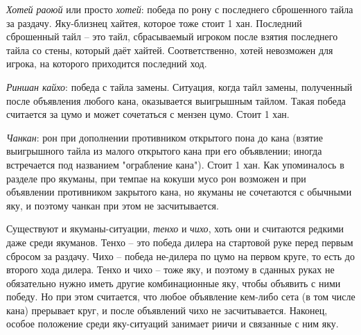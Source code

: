 \textit{Хотей раоюй} или просто \textit{хотей}: победа по рону с последнего сброшенного тайла за раздачу. Яку-близнец хайтея, которое тоже стоит 1 хан. Последний сброшенный тайл – это тайл, сбрасываемый игроком после взятия последнего тайла со стены, который даёт хайтей. Соответственно, хотей невозможен для игрока, на которого приходится последний ход.

\textit{Риншан кайхо}: победа с тайла замены. Ситуация, когда тайл замены, полученный после объявления любого кана, оказывается выигрышным тайлом. Такая победа считается за цумо и может сочетаться с мензен цумо. Стоит 1 хан. 

\textit{Чанкан}: рон при дополнении противником открытого пона до кана (взятие выигрышного тайла из малого открытого кана при его объявлении; иногда встречается под названием "ограбление кана"). Стоит 1 хан. Как упоминалось в разделе про якуманы, при темпае на кокуши мусо рон возможен и при объявлении противником закрытого кана, но якуманы не сочетаются с обычными яку, и поэтому чанкан при этом не засчитывается.

Существуют и якуманы-ситуации, \textit{тенхо} и \textit{чихо}, хоть они и считаются редкими даже среди якуманов. Тенхо – это победа дилера на стартовой руке перед первым сбросом за раздачу. Чихо – победа не-дилера по цумо на первом круге, то есть до второго хода дилера.  Тенхо и чихо – тоже яку, и поэтому в сданных руках не обязательно нужно иметь другие комбинационные яку, чтобы объявить с ними победу. Но при этом считается, что любое объявление кем-либо сета (в том числе кана) прерывает круг, и после объявлений чихо не засчитывается. Наконец, особое положение среди яку-ситуаций занимает риичи и связанные с ним яку. 